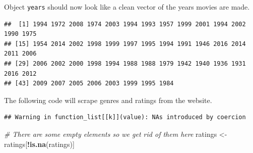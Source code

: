 \documentclass[]{book}
\newenvironment{Shaded}{\begin{snugshade}}{\end{snugshade}}
\newcommand{\CharTok}[1]{\textcolor[rgb]{0.31,0.60,0.02}{#1}}
\newcommand{\CommentTok}[1]{\textcolor[rgb]{0.56,0.35,0.01}{\textit{#1}}}
\newcommand{\DataTypeTok}[1]{\textcolor[rgb]{0.13,0.29,0.53}{#1}}
\newcommand{\KeywordTok}[1]{\textcolor[rgb]{0.13,0.29,0.53}{\textbf{#1}}}
\newcommand{\NormalTok}[1]{#1}
\newcommand{\OperatorTok}[1]{\textcolor[rgb]{0.81,0.36,0.00}{\textbf{#1}}}
\newcommand{\StringTok}[1]{\textcolor[rgb]{0.31,0.60,0.02}{#1}}
\begin{document}
Object \texttt{years} should now look like a clean vector of the years movies are made.

\begin{verbatim}
##  [1] 1994 1972 2008 1974 2003 1994 1993 1957 1999 2001 1994 2002 1990 1975
## [15] 1954 2014 2002 1998 1999 1997 1995 1994 1991 1946 2016 2014 2011 2006
## [29] 2006 2002 2000 1998 1994 1988 1988 1979 1942 1940 1936 1931 2016 2012
## [43] 2009 2007 2005 2006 2003 1999 1995 1984
\end{verbatim}

The following code will scrape genres and ratings from the website.

\begin{Shaded}
\end{Shaded}

\begin{verbatim}
## Warning in function_list[[k]](value): NAs introduced by coercion
\end{verbatim}

\begin{Shaded}
\begin{Highlighting}[]
\CommentTok{# There are some empty elements so we get rid of them here}
\NormalTok{ratings <-}\StringTok{ }\NormalTok{ratings[}\OperatorTok{!}\KeywordTok{is.na}\NormalTok{(ratings)]}
\end{Highlighting}
\end{Shaded}
\end{document}
